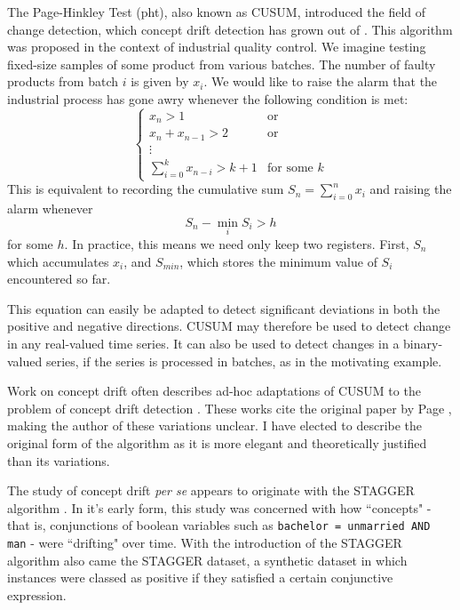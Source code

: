 The Page-Hinkley Test (pht), also known as CUSUM, introduced the field of change detection, which concept drift detection has grown out of \cite{CUSUM}. This algorithm was proposed in the context of industrial quality control. We imagine testing fixed-size samples of some product from various batches. The number of faulty products from batch $i$ is given by $x_i$. We would like to raise the alarm that the industrial process has gone awry whenever the following condition is met:
\begin{equation}
    \begin{cases}
        x_n > 1 & \text{or} \\
        x_n + x_{n-1} > 2 & \text{or} \\
        \vdots \\
        \sum_{i=0}^k x_{n-i} > k + 1 & \text{for some $k$}
    \end{cases}
\end{equation}
This is equivalent to recording the cumulative sum $S_n = \sum_{i=0}^n x_i$ and raising the alarm whenever
\begin{equation}
    S_n - \min_{i} S_i > h
\end{equation}
for some $h$. In practice, this means we need only keep two registers. First, $S_n$ which accumulates $x_i$, and $S_{min}$, which stores the minimum value of $S_i$ encountered so far.

This equation can easily be adapted to detect significant deviations in both the positive and negative directions. CUSUM may therefore be used to detect change in any real-valued time series. It can also be used to detect changes in a binary-valued series, if the series is processed in batches, as in the motivating example. 

Work on concept drift often describes ad-hoc adaptations of CUSUM to the problem of concept drift detection \cite{barros_comparison}\cite{gama_survey}. These works cite the original paper by Page \cite{CUSUM}, making the author of these variations unclear. I have elected to describe the original form of the algorithm as it is more elegant and theoretically justified than its variations.

The study of concept drift {\it per se} appears to originate with the STAGGER algorithm \cite{STAGGER}. In it's early form, this study was concerned with how ``concepts" - that is, conjunctions of boolean variables such as {\tt bachelor = unmarried AND man} - were ``drifting" over time.  With the introduction of the STAGGER algorithm also came the STAGGER dataset, a synthetic dataset in which instances were classed as positive if they satisfied a certain conjunctive expression. 

